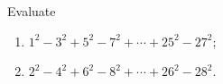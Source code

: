 Evaluate
\begin{enumerate}
\item[(a)] $1^2-3^2+5^2-7^2+\cdots+25^2-27^2$;
\item[(b)] $2^2-4^2+6^2-8^2+\cdots+26^2-28^2$.
\end{enumerate}
